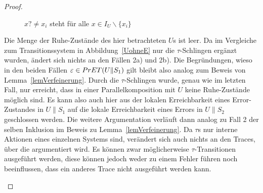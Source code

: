 \begin{proof}
\begin{itemize}
\begin{figure} [h!tbp]
\begin{center}
        \caption{$x?\neq x_i$ steht für alle $x\in I_U\backslash\{x_i\}$}
\label{UohneEmitTau}
      \end{center}
      \end{figure}
      Die Menge der Ruhe-Zustände des hier betrachteten $U$s ist leer. Da im
      Vergleiche zum Transitionssystem in Abbildung~\ref{UohneE} nur die
      $\tau$-Schlingen ergänzt wurden, ändert sich nichts an den Fällen 2a) und
      2b). Die Begründungen, wieso in den beiden Fällen $\varepsilon\in
      PrET{}(U\|S_1)$ gilt bleibt also analog zum Beweis von
      Lemma~\ref{lemVerfeinerung}. Durch die $\tau$-Schlingen wurde, genau wie
      im letzten Fall, nur erreicht, dass in einer Parallelkomposition mit $U$
      keine Ruhe-Zustände möglich sind. Es kann also auch hier aus der lokalen
      Erreichbarkeit eines Error-Zustandes in $U\|S_1$ auf die lokale
      Erreichbarkeit eines Errors in $U\|S_2$ geschlossen werden. Die weitere
      Argumentation verläuft dann analog zu Fall 2 der selben Inklusion im
      Beweis zu Lemma~\ref{lemVerfeinerung}. Da $\tau$s nur interne Aktionen
      eines einzelnen Systems sind, verändert sich auch nichts an den Traces,
      über die argumentiert wird. Es können zwar möglicherweise
      $\tau$-Transitionen ausgeführt werden, diese können jedoch weder zu einem
      Fehler führen noch beeinflussen, dass ein anderes Trace nicht ausgeführt
      werden kann.
  \end{itemize}


\end{proof}

